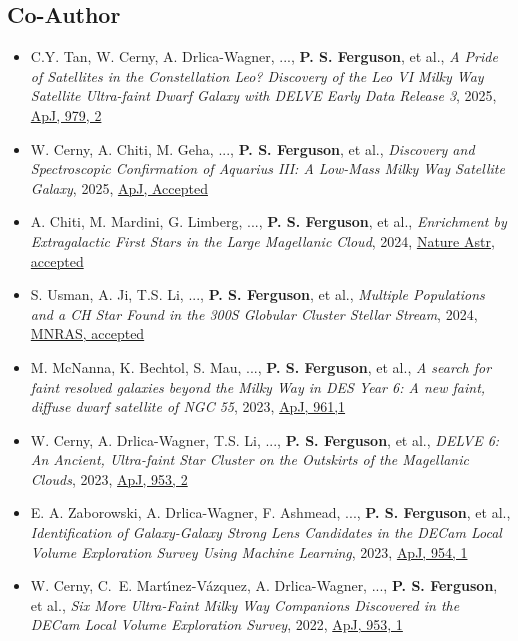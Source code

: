 \subsection{Co-Author}
\begin{itemize}[itemsep=1pt]
    \item C.Y. Tan, W. Cerny, A. Drlica-Wagner, ..., \textbf{P. S. Ferguson}, et al., \textit{A Pride of Satellites in the Constellation Leo? Discovery of the Leo VI Milky Way Satellite Ultra-faint Dwarf Galaxy with DELVE Early Data Release 3}, 2025, \href{https://ui.adsabs.harvard.edu/abs/2024arXiv240800865T}{ApJ, 979, 2}
    \item W. Cerny, A. Chiti, M. Geha, ..., \textbf{P. S. Ferguson}, et al., \textit{Discovery and Spectroscopic Confirmation of Aquarius III: A Low-Mass Milky Way Satellite Galaxy}, 2025, \href{https://ui.adsabs.harvard.edu/abs/2024arXiv241000981C}{ApJ, Accepted}
    \item A. Chiti, M. Mardini, G. Limberg, ..., \textbf{P. S. Ferguson}, et al., \textit{Enrichment by Extragalactic First Stars in the Large Magellanic Cloud}, 2024, \href{https://ui.adsabs.harvard.edu/abs/2024arXiv240111307C}{Nature Astr, accepted}
    \item S. Usman, A. Ji, T.S. Li, ..., \textbf{P. S. Ferguson}, et al., \textit{Multiple Populations and a CH Star Found in the 300S Globular Cluster Stellar Stream}, 2024, \href{https://ui.adsabs.harvard.edu/abs/2024MNRAS.tmp..241U}{MNRAS, accepted}
    \item M. McNanna, K. Bechtol, S. Mau, ..., \textbf{P. S. Ferguson}, et al., \textit{A search for faint resolved galaxies beyond the Milky Way in DES Year 6: A new faint, diffuse dwarf satellite of NGC 55}, 2023, \href{https://ui.adsabs.harvard.edu/abs/2023arXiv230904467M}{ApJ, 961,1}
    \item W. Cerny, A. Drlica-Wagner, T.S. Li, ..., \textbf{P. S. Ferguson}, et al., \textit{DELVE 6: An Ancient, Ultra-faint Star Cluster on the Outskirts of the Magellanic Clouds}, 2023, \href{https://ui.adsabs.harvard.edu/abs/2023ApJ...953L..21C}{ApJ, 953, 2}
    \item E. A. Zaborowski, A. Drlica-Wagner, F. Ashmead, ..., \textbf{P. S. Ferguson}, et al., \textit{Identification of Galaxy-Galaxy Strong Lens Candidates in the DECam Local Volume Exploration Survey Using Machine Learning}, 2023, \href{https://ui.adsabs.harvard.edu/abs/2023ApJ...954...68Z}{ApJ, 954, 1}
    \item W. Cerny, C.~E. {Mart{\'\i}nez-V{\'a}zquez}, A. Drlica-Wagner, ..., \textbf{P. S. Ferguson}, et al., \textit{Six More Ultra-Faint Milky Way Companions Discovered in the DECam Local Volume Exploration Survey}, 2022, \href{https://ui.adsabs.harvard.edu/abs/2022arXiv220912422C}{ApJ, 953, 1}

\end{itemize}
